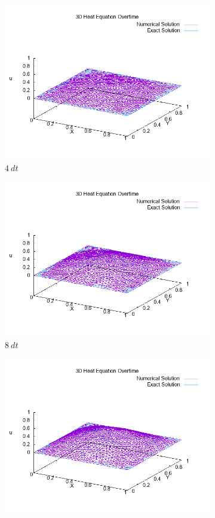 \documentclass[a4paper,10pt]{article}
\begin{document}
\newpage
\begin{figure}[h!]
	\begin{subfigure}{.5\textwidth}
		\centering
		\includegraphics[width=0.9\linewidth]{picture/heatplot_frame-004}
		\caption{$ 4 \ dt $}
		\label{}
	\end{subfigure}
		\begin{subfigure}{.5\textwidth}
		\centering
		\includegraphics[width=0.9\linewidth]{picture/heatplot_frame-008}
		\caption{$ 8 \ dt $}
		\label{}
	\end{subfigure}
	\begin{subfigure}{.5\textwidth}
		\centering
		\includegraphics[width=0.9\linewidth]{picture/heatplot_frame-012}

\end{subfigure}
\end{figure}
\end{document}
